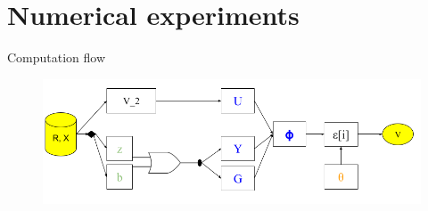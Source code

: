 \documentclass{beamer}
\begin{document}
\section{Numerical experiments}
\begin{frame}{Computation flow}
    \begin{figure}[H]
        \centering
            \includegraphics[scale=0.4]{img/slide/Computation flow.png}
        \label{fig:computation_flow}
    \end{figure}
\end{frame}
\end{document}
